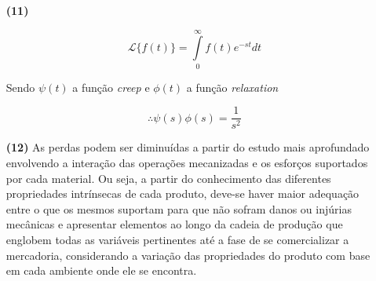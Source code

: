 \documentclass[a4paper, 12pt, brazilian]{article}
\begin{document}
\begin{itemize}
		\item[\textbf{(11)}]
		
		\begin{equation}
			\mathscr{L}\{f(t)\}=\int\limits_{0}^{\infty}f(t)e^{-st}dt
		\end{equation}
		
		Sendo $\psi(t)$ a função \textit{creep} e $\phi(t)$ a função \textit{relaxation}
		
		\begin{equation}
			\therefore\psi(s)\phi(s)=\dfrac{1}{s^{2}}
		\end{equation} 
		
		
		\item[\textbf{(12)}] As perdas podem ser diminuídas a partir do estudo mais aprofundado envolvendo a interação das operações mecanizadas e os esforços suportados por cada material. Ou seja, a partir do conhecimento das diferentes propriedades intrínsecas de cada produto, deve-se haver maior adequação entre o que os mesmos suportam para que não sofram danos ou injúrias mecânicas e apresentar elementos ao longo da cadeia de produção que englobem todas as variáveis pertinentes até a fase de se comercializar a mercadoria, considerando a variação das propriedades do produto com base em cada ambiente onde ele se encontra.
	\end{itemize} 
\end{document}
